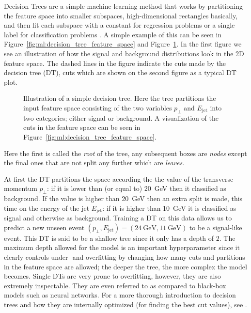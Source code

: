 Decision Trees are a simple machine learning method that works by partitioning the feature space into smaller subspaces, high-dimensional rectangles basically, and then fit each subspace with a constant for regression problems or a single label for classification problems \citep{hastieElementsStatisticalLearning2009}. A simple example of this can be seen in Figure~\ref{fig:ml:decision_tree_feature_space} and Figure~\ref{fig:ml:decision_tree}. In the first figure we see an illustration of how the signal and background distributions look in the 2D feature space. The dashed lines in the figure indicate the cuts made by the decision tree (DT), cuts which are shown on the second figure as a typical DT plot. 
\begin{figure}
  \centering
  \caption[Decision Tree]{
    Illustration of a simple decision tree. Here the tree partitions the input feature space consisting of the two variables $p_\perp$ and $E_\mathrm{jet}$ into two categories; either signal or background. A visualization of the cuts in the feature space can be seen in Figure~\ref{fig:ml:decision_tree_feature_space}.
  }
  \label{fig:ml:decision_tree}
\end{figure}
Here the first  is called the \emph{root} of the tree, any subsequent boxes are \emph{nodes} except the final ones that are not split any further which are \emph{leaves}.

At first the DT partitions the space according the the value of the transverse momentum $p_\perp$: if it is lower than (or equal to) \SI{20}{\GeV} then it classified as background. If the value is higher than \SI{20}{\GeV} then an extra split is made, this time on the energy of the jet $E_\mathrm{jet}$: if it is higher than \SI{10}{\GeV} it is classified as signal and otherwise as background. Training a DT on this data allows us to predict a new unseen event $(p_\perp, E_\mathrm{jet}) = (\SI{24}{\GeV},\SI{11}{\GeV})$ to be a signal-like event. This DT is said to be a shallow tree since it only has a depth of \num{2}. The maximum depth allowed for the model is an important hyperparameter since it clearly controls under- and overfitting by changing how many cuts and partitions in the feature space are allowed; the deeper the tree, the more complex the model becomes. Single DTs are very prone to overfitting, however, they are also extremely inspectable. They are even referred to as  compared to black-box models such as neural networks. For a more thorough introduction to decision trees and how they are internally optimized (for finding the best cut values), see \citet{hastieElementsStatisticalLearning2009}. 

